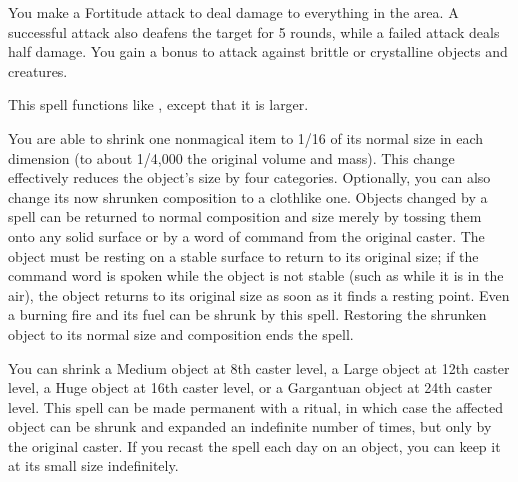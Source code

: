 \spelleffect You make a Fortitude attack to deal damage to everything in the area. A successful attack also deafens the target for 5 rounds, while a failed attack deals half damage. You gain a  bonus to attack against brittle or crystalline objects and creatures.

\spelleffect This spell functions like , except that it is larger.

\spelleffect You are able to shrink one nonmagical item to 1/16 of its normal size in each dimension (to about 1/4,000 the original volume and mass). This change effectively reduces the object's size by four categories. Optionally, you can also change its now shrunken composition to a clothlike one. Objects changed by a  spell can be returned to normal composition and size merely by tossing them onto any solid surface or by a word of command from the original caster. The object must be resting on a stable surface to return to its original size; if the command word is spoken while the object is not stable (such as while it is in the air), the object returns to its original size as soon as it finds a resting point. Even a burning fire and its fuel can be shrunk by this spell. Restoring the shrunken object to its normal size and composition ends the spell.
\par You can shrink a Medium object at 8th caster level, a Large object at 12th caster level, a Huge object at 16th caster level, or a Gargantuan object at 24th caster level.
\spellnotes This spell can be made permanent with a  ritual, in which case the affected object can be shrunk and expanded an indefinite number of times, but only by the original caster. If you recast the spell each day on an object, you can keep it at its small size indefinitely.

